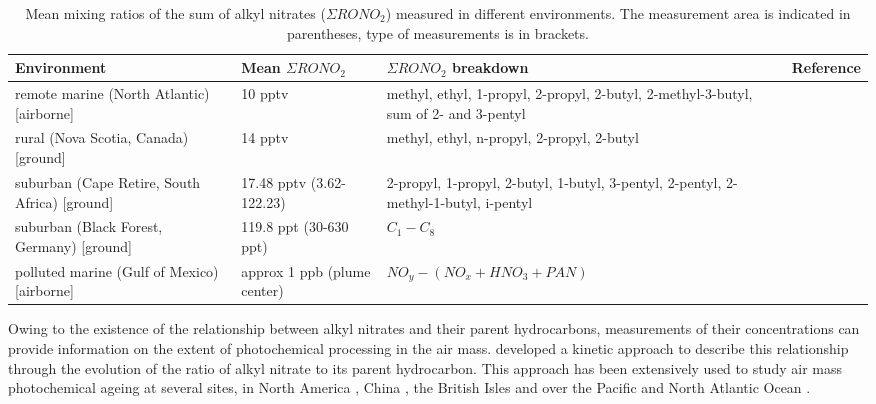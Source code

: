 \documentclass[11pt,a4paper]{article}
\begin{document}
\renewcommand{\arraystretch}{1}
\begin{table}[h!]
\caption{Mean mixing ratios of the sum of alkyl nitrates ($\Sigma RONO_2$) measured in different environments. The measurement area is indicated in parentheses, type of measurements is in brackets.}\label{tab:ANmean} %
\begin{tabularx}{\linewidth}{P{3cm}P{2cm}P{5cm}X}
\hline
Environment     & Mean $\Sigma RONO_2$ & $\Sigma RONO_2$ breakdown & Reference \\
\hline
remote marine (North Atlantic) [airborne]   & 10 pptv    & methyl, ethyl, 1-propyl, 2-propyl, 2-butyl, 2-methyl-3-butyl, sum of 2- and 3-pentyl  & \citep{Reeves2007} \\
\hline
rural (Nova Scotia, Canada) [ground]        & 14 pptv    & methyl, ethyl, n-propyl, 2-propyl, 2-butyl  & \citep{Roberts1998} \\
\hline
suburban (Cape Retire, South Africa) [ground] & 17.48 pptv (3.62-122.23) & 2-propyl, 1-propyl, 2-butyl, 1-butyl, 3-pentyl, 2-pentyl, 2-methyl-1-butyl, i-pentyl & \citep{DeKock1994} \\
\hline
suburban (Black Forest, Germany) [ground]   & 119.8 ppt (30-630 ppt) & $C_1-C_8$ & \citep{Flocke1998} \\
\hline
polluted marine (Gulf of Mexico) [airborne] & approx 1 ppb (plume center)& $NO_y-(NO_x+HNO_3+PAN)$ & \citep{Neuman2012} \\
\hline
\end{tabularx}
\end{table}

Owing to the existence of the relationship between alkyl nitrates and their parent hydrocarbons, measurements of their concentrations can provide information on the extent of photochemical processing in the air mass. \cite{Bertman1995} developed a kinetic approach to describe this relationship through the evolution of the ratio of alkyl nitrate to its parent hydrocarbon. This approach has been extensively used to study air mass photochemical ageing at several sites, in North America \citep{Bertman1995,Roberts1998}, China \citep{Simpson2006}, the British Isles \citep{Worton2010} and over the Pacific \citep{Simpson2003} and North Atlantic Ocean \citep{Reeves2007,Stroud2001}.
\end{document}
